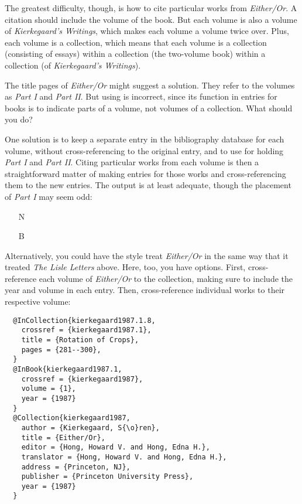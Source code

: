 \documentclass[11pt,letterpaper,oneside]{article}
\begin{document}
The greatest difficulty, though, is how to cite particular works from
\textit{Either/Or}. A citation should include the volume of the book.
But each volume is also a volume of \textit{Kierkegaard's Writings},
which makes each volume a volume twice over. Plus, each volume is a
collection, which means that each volume is a collection (consisting
of essays) within a collection (the two-volume book) within a
collection (of \textit{Kierkegaard's Writings}).

The title pages of \textit{Either/Or} might suggest a solution. They
refer to the volumes as \textit{Part I} and \textit{Part II}. But
using  is incorrect, since its function in entries for
books is to indicate parts of a volume, not volumes of a collection.
What should you do?

One solution is to keep a separate entry in the bibliography database
for each volume, without cross-referencing to the original entry, and
to use  for holding \textit{Part I} and \textit{Part
II}. Citing particular works from each volume is then a
straightforward matter of making  entries for
those works and cross-referencing them to the new 
entries. The output is at least adequate, though the placement of
\textit{Part I} may seem odd:

\begin{itemize}
\item[N] 

\item[B] 
\end{itemize}

\noindent Alternatively, you could have the style treat
\textit{Either/Or} in the same way that it treated \textit{The Lisle
Letters} above. Here, too, you have options. First, cross-reference
each volume of \textit{Either/Or} to the collection, making sure to
include the year and volume in each  entry. Then,
cross-reference individual works to their respective volume:

\begin{lstlisting}
  @InCollection{kierkegaard1987.1.8,
    crossref = {kierkegaard1987.1},
    title = {Rotation of Crops},
    pages = {281--300},
  }
  @InBook{kierkegaard1987.1,
    crossref = {kierkegaard1987},
    volume = {1},
    year = {1987}
  }
  @Collection{kierkegaard1987,
    author = {Kierkegaard, S{\o}ren},
    title = {Either/Or},
    editor = {Hong, Howard V. and Hong, Edna H.},
    translator = {Hong, Howard V. and Hong, Edna H.},
    address = {Princeton, NJ},
    publisher = {Princeton University Press},
    year = {1987}
  }
\end{lstlisting}
\end{document}
